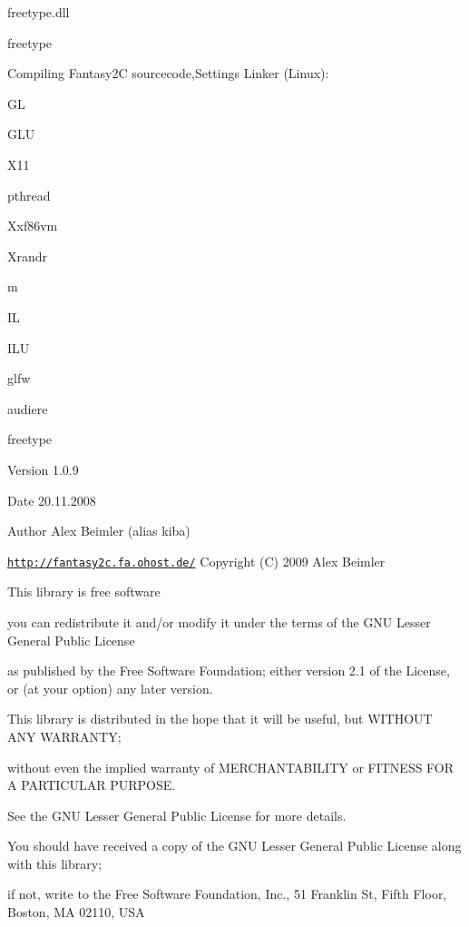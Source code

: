  freetype.dll \par
 freetype \par
 \par
 Compiling Fantasy2C sourcecode,Settings Linker (Linux): \par
 GL \par
 GLU \par
 X11 \par
 pthread \par
 Xxf86vm \par
 Xrandr \par
 m \par
 IL \par
 ILU \par
 glfw \par
 audiere \par
 freetype \par
 \par
 \begin{DoxyVersion}{Version}
1.0.9 
\end{DoxyVersion}
\begin{DoxyDate}{Date}
20.11.2008 
\end{DoxyDate}
\begin{DoxyAuthor}{Author}
Alex Beimler (alias kiba) \par
 \href{http://fantasy2c.fa.ohost.de/}{\tt http://fantasy2c.fa.ohost.de/} Copyright (C) 2009 Alex Beimler \par
 \par
 This library is free software \par
 you can redistribute it and/or modify it under the terms of the GNU Lesser General Public License \par
 as published by the Free Software Foundation; either version 2.1 of the License, or (at your option) any later version. \par
 This library is distributed in the hope that it will be useful, but WITHOUT ANY WARRANTY; \par
 without even the implied warranty of MERCHANTABILITY or FITNESS FOR A PARTICULAR PURPOSE. \par
 See the GNU Lesser General Public License for more details. \par
 \par
 You should have received a copy of the GNU Lesser General Public License along with this library; \par
 if not, write to the Free Software Foundation, Inc., 51 Franklin St, Fifth Floor, Boston, MA 02110, USA \par
 
\end{DoxyAuthor}
